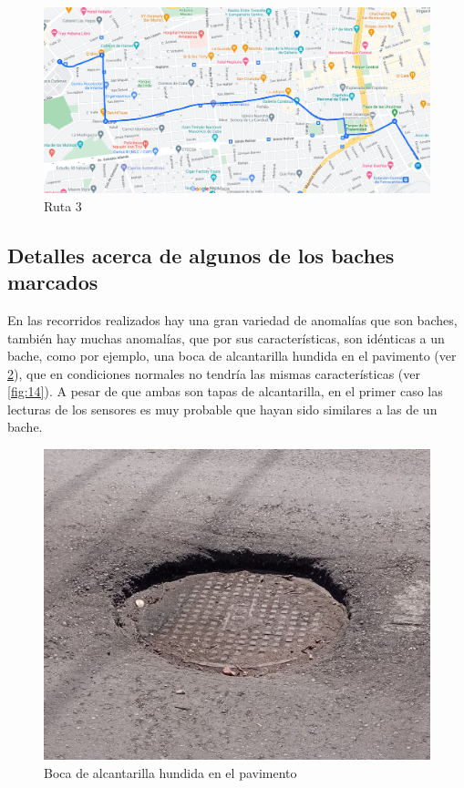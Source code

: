 	\begin{figure}[htb]
		\centering
		\includegraphics[scale = 0.4]{Graphics/route_3_EgidoArsenal_LyJovellarHotelColina.png}
		\caption{Ruta 3}
		\label{fig:12}
	\end{figure}

	\subsection{Detalles acerca de algunos de los baches marcados}
		En las recorridos realizados hay una gran variedad de anomalías que son baches, también hay muchas anomalías, que por sus características,
		son idénticas a un bache, como por ejemplo, una boca de alcantarilla hundida en el pavimento (ver \ref{fig:13}), que en condiciones normales no 
		tendría las mismas características (ver \ref{fig:14}). A pesar de que ambas son tapas de alcantarilla, en el primer caso las lecturas de los 
		sensores es muy probable que hayan sido similares a las de un bache.
		
		\begin{figure}[htb]
			\centering
			\includegraphics[scale = 0.4]{Graphics/pothole_3.jpg}
			\caption{Boca de alcantarilla hundida en el pavimento}
			\label{fig:13}
		\end{figure}

